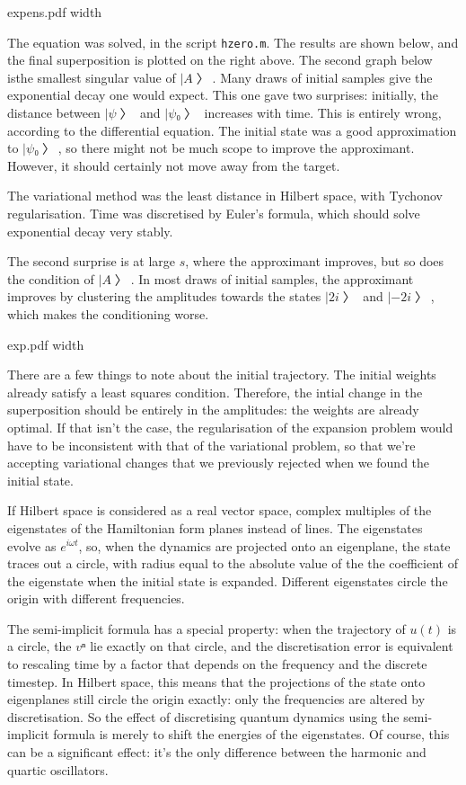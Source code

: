 \topinsert \XeTeXpicfile expens.pdf width \hsize \endinsert

The equation was solved, in the script {\tt hzero.m}.  The results are shown below, and the final superposition is plotted on the right above.  The second graph below isthe smallest singular value of $|A〉$.  Many draws of initial samples give the exponential decay one would expect.  This one gave two surprises: initially, the distance between $|ψ〉$ and $|ψ₀〉$ increases with time.  This is entirely wrong, according to the differential equation.  The initial state was a good approximation to $|ψ₀〉$, so there might not be much scope to improve the approximant.  However, it should certainly not move away from the target.

The variational method was the least distance in Hilbert space, with Tychonov regularisation.  Time was discretised by Euler's formula, which should solve exponential decay very stably.

The second surprise is at large $s$, where the approximant improves, but so does the condition of $|A〉$.  In most draws of initial samples, the approximant improves by clustering the amplitudes towards the states $|2i〉$ and $|-2i〉$, which makes the conditioning worse.

\topinsert \XeTeXpicfile exp.pdf width \hsize \endinsert

There are a few things to note about the initial trajectory.  The initial weights already satisfy a least squares condition.  Therefore, the intial change in the superposition should be entirely in the amplitudes: the weights are already optimal.  If that isn't the case, the regularisation of the expansion problem would have to be inconsistent with that of the variational problem, so that we're accepting variational changes that we previously rejected when we found the initial state.


If Hilbert space is considered as a real vector space, complex multiples of the eigenstates of the Hamiltonian form planes instead of lines.  The eigenstates evolve as $e^{iωt}$, so, when the dynamics are projected onto an eigenplane, the state traces out a circle, with radius equal to the absolute value of the the coefficient of the eigenstate when the initial state is expanded.  Different eigenstates circle the origin with different frequencies.

The semi-implicit formula has a special property: when the trajectory of $u(t)$ is a circle, the $vⁿ$ lie exactly on that circle, and the discretisation error is equivalent to rescaling time by a factor that depends on the frequency and the discrete timestep.  In Hilbert space, this means that the projections of the state onto eigenplanes still circle the origin exactly: only the frequencies are altered by discretisation.  So the effect of discretising quantum dynamics using the semi-implicit formula is merely to shift the energies of the eigenstates.  Of course, this can be a significant effect: it's the only difference between the harmonic and quartic oscillators.

